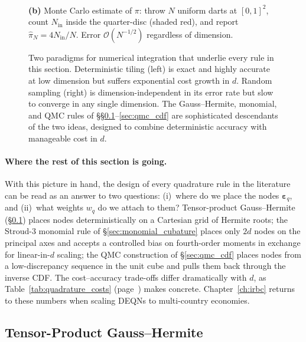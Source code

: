 \documentclass[11pt,a4paper]{report}
\begin{document}
\begin{figure}[ht]
\begin{minipage}[c]{0.46\textwidth}
\\[2pt]
{\scriptsize\textbf{(b)} Monte Carlo estimate of $\pi$: throw $N$ uniform darts at $[0,1]^2$, count $N_{\mathrm{in}}$ inside the quarter-disc (shaded red), and report $\widehat{\pi}_N = 4N_{\mathrm{in}}/N$.  Error $\mathcal{O}(N^{-1/2})$ regardless of dimension.}
\end{minipage}
\caption{Two paradigms for numerical integration that underlie every rule in this section.  Deterministic tiling (left) is exact and highly accurate at low dimension but suffers exponential cost growth in $d$.  Random sampling (right) is dimension-independent in its error rate but slow to converge in any single dimension.  The Gauss--Hermite, monomial, and QMC rules of \S\S\ref{sec:gh_tensor_product}--\ref{sec:qmc_cdf} are sophisticated descendants of the two ideas, designed to combine deterministic accuracy with manageable cost in $d$.}
\label{fig:integration_primer}
\end{figure}

\paragraph{Where the rest of this section is going.}  With this picture in hand, the design of every quadrature rule in the literature can be read as an answer to two questions: (i)~where do we place the nodes $\bm\varepsilon_q$, and (ii)~what weights $w_q$ do we attach to them?  Tensor-product Gauss--Hermite (\S\ref{sec:gh_tensor_product}) places nodes deterministically on a Cartesian grid of Hermite roots; the Stroud-3 monomial rule of \S\ref{sec:monomial_cubature} places only $2d$ nodes on the principal axes and accepts a controlled bias on fourth-order moments in exchange for linear-in-$d$ scaling; the QMC construction of \S\ref{sec:qmc_cdf} places nodes from a low-discrepancy sequence in the unit cube and pulls them back through the inverse CDF.  The cost--accuracy trade-offs differ dramatically with $d$, as Table~\ref{tab:quadrature_costs} (page~\pageref{tab:quadrature_costs}) makes concrete.  Chapter~\ref{ch:irbc} returns to these numbers when scaling DEQNs to multi-country economies.

\subsection{Tensor-Product Gauss--Hermite}
\label{sec:gh_tensor_product}
\end{document}
